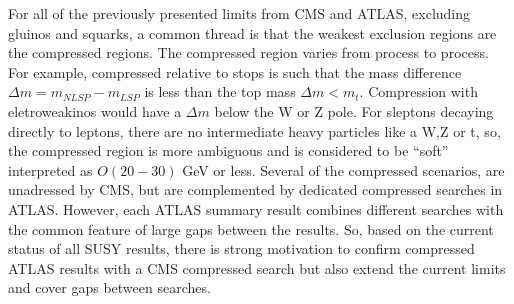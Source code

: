 

For all of the previously presented limits from CMS and ATLAS, excluding gluinos and squarks, a common thread is that the weakest exclusion regions are the compressed regions. The compressed region varies from process to process. For example, compressed relative to stops is such that the mass difference $\Delta m = m_{NLSP} - m_{LSP}$ is less than the top mass $\Delta m < m_t$. Compression with eletroweakinos would have a $\Delta m$  below the W or Z pole. For sleptons decaying directly to leptons, there are no intermediate heavy particles like a W,Z or t, so, the compressed region is more ambiguous and is considered to be ``soft'' interpreted as $O(20-30)$ GeV or less. Several of the compressed scenarios, are unadressed by CMS, but are complemented by dedicated compressed searches in ATLAS. However, each ATLAS summary result combines different searches with the common feature of large gaps between the results. So, based on the current status of all SUSY results, there is strong motivation to confirm compressed ATLAS results with a CMS compressed search but also extend the current limits and cover gaps between searches.

